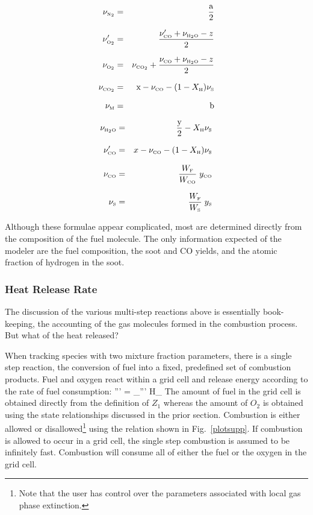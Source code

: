 \documentclass[11pt]{book}
\begin{document}
\parbox{2.5in}{
\begin{eqnarray*} \nu_{\tiny \hbox{N}_2}  &=& \frac{\hbox{a}}{2}\\*[.1in]
                  \nu_{\tiny \hbox{O}_2}' &=& \frac{\nu_{\tiny \hbox{CO}}'+\nu_{\tiny \hbox{H}_2\hbox{O}}-z}{2}\\*[.1in]
                  \nu_{\tiny \hbox{O}_2}  &=& \nu_{\tiny \hbox{CO}_2} + \frac{\nu_{\tiny \hbox{CO}}+\nu_{\tiny \hbox{H}_2\hbox{O}}-z}{2}\\*[.1in]
                  \nu_{\tiny \hbox{CO}_2} &=& \hbox{x} - \nu_{\tiny \hbox{CO}} - (1-X_{\tiny \hbox{H}}) \nu_{\tiny \hbox{S}} \\*[.1in]
                  \nu_{\tiny \hbox{M}}     &=& \hbox{b} \end{eqnarray*} }
\hfill \parbox{3.5in}{\begin{eqnarray}
                  \nu_{\tiny \hbox{H}_2\hbox{O}} &=& \frac{\hbox{y}}{2}- X_{\tiny \hbox{H}} \nu_{\tiny \hbox{S}}\\*[.1in]
                  \nu_{\tiny \hbox{CO}}'   &=& x - \nu_{\tiny \hbox{CO}} - (1-X_{\tiny \hbox{H}}) \nu_{\tiny \hbox{S}} \\*[.1in]
                  \nu_{\tiny \hbox{CO}}    &=& \frac{W_{\tiny \hbox{F}}}{W_{\tiny \hbox{CO}}} \; y_{\tiny \hbox{CO}} \\*[.1in]
                  \nu_{\tiny \hbox{S}}    &=& \frac{W_{\tiny \hbox{F}}}{W_{\tiny \hbox{S}}} \; y_{\tiny \hbox{S}}
\end{eqnarray} }
Although these formulae appear complicated, most are determined directly from the composition of the fuel molecule. The only information
expected of the modeler are the fuel composition, the soot and CO yields, and the atomic fraction of hydrogen in the soot.


\subsubsection{Heat Release Rate}

The discussion of the various multi-step reactions above is essentially book-keeping, the accounting of the gas
molecules formed in the combustion process. But what of the heat released?

When tracking species with two mixture fraction parameters, there is a single step reaction, the conversion of fuel into a
fixed, predefined set of combustion products.  Fuel and oxygen react within a grid cell and release energy according to
the rate of fuel consumption:
\be \dq''' = \dm_\F''' \Delta H_{\F} \ee
The amount of fuel in the grid cell is obtained directly from the definition of $Z_1$ whereas the amount of $O_2$ is
obtained using the state relationships discussed in the prior section.  Combustion is either allowed or
disallowed\footnote{Note that the user has control over the parameters associated with local gas phase extinction.}
using the relation shown in Fig.~\ref{plotsupp}.
If combustion is allowed to occur in a grid
cell, the single step combustion is assumed to be
infinitely fast.  Combustion will consume all of either the fuel or the oxygen in the grid cell.
\end{document}
